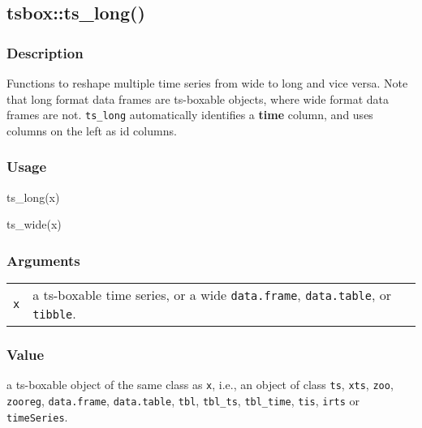 \documentclass[
  letterpaper,
  DIV=11,
  numbers=noendperiod]{scrreport}
\newenvironment{Shaded}{\begin{snugshade}}{\end{snugshade}}
\newcommand{\FunctionTok}[1]{\textcolor[rgb]{0.28,0.35,0.67}{#1}}
\newcommand{\NormalTok}[1]{\textcolor[rgb]{0.00,0.23,0.31}{#1}}
\begin{document}
\subsection{tsbox::ts\_long()}\label{tsboxts_long}

\subsubsection{Description}\label{description-51}

Functions to reshape multiple time series from
\textquotesingle wide\textquotesingle{} to
\textquotesingle long\textquotesingle{} and vice versa. Note that long
format data frames are ts-boxable objects, where wide format data frames
are not. \texttt{ts\_long} automatically identifies a \textbf{time}
column, and uses columns on the left as id columns.

\subsubsection{Usage}\label{usage-51}

\begin{Shaded}
\begin{Highlighting}[]
\FunctionTok{ts\_long}\NormalTok{(x)}

\FunctionTok{ts\_wide}\NormalTok{(x)}
\end{Highlighting}
\end{Shaded}

\subsubsection{Arguments}\label{arguments-51}

\begin{longtable}[]{@{}ll@{}}
\toprule\noalign{}
\endhead
\bottomrule\noalign{}
\endlastfoot
\texttt{x} & a ts-boxable time series, or a wide \texttt{data.frame},
\texttt{data.table}, or \texttt{tibble}. \\
\end{longtable}

\subsubsection{Value}\label{value-51}

a ts-boxable object of the same class as \texttt{x}, i.e., an object of
class \texttt{ts}, \texttt{xts}, \texttt{zoo}, \texttt{zooreg},
\texttt{data.frame}, \texttt{data.table}, \texttt{tbl},
\texttt{tbl\_ts}, \texttt{tbl\_time}, \texttt{tis}, \texttt{irts} or
\texttt{timeSeries}.
\end{document}
